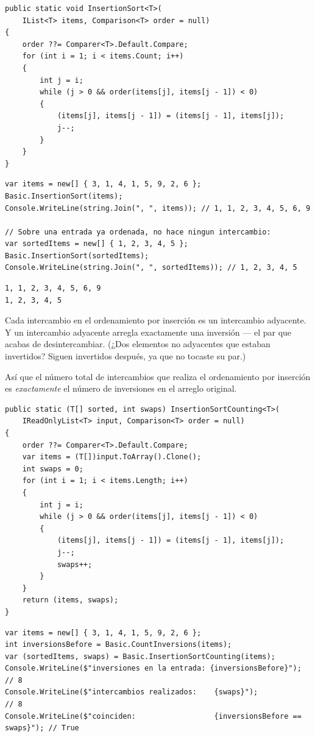 \documentclass[11pt,a4paper]{article}
\begin{document}
\begin{lstlisting}[caption={Ordenamiento por inserción}]
public static void InsertionSort<T>(
    IList<T> items, Comparison<T> order = null)
{
    order ??= Comparer<T>.Default.Compare;
    for (int i = 1; i < items.Count; i++)
    {
        int j = i;
        while (j > 0 && order(items[j], items[j - 1]) < 0)
        {
            (items[j], items[j - 1]) = (items[j - 1], items[j]);
            j--;
        }
    }
}
\end{lstlisting}

\begin{lstlisting}
var items = new[] { 3, 1, 4, 1, 5, 9, 2, 6 };
Basic.InsertionSort(items);
Console.WriteLine(string.Join(", ", items)); // 1, 1, 2, 3, 4, 5, 6, 9

// Sobre una entrada ya ordenada, no hace ningun intercambio:
var sortedItems = new[] { 1, 2, 3, 4, 5 };
Basic.InsertionSort(sortedItems);
Console.WriteLine(string.Join(", ", sortedItems)); // 1, 2, 3, 4, 5
\end{lstlisting}

\begin{verbatim}
1, 1, 2, 3, 4, 5, 6, 9
1, 2, 3, 4, 5
\end{verbatim}

Cada intercambio en el ordenamiento por inserción es un intercambio adyacente. Y un intercambio adyacente arregla exactamente una inversión --- el par que acabas de desintercambiar. (¿Dos elementos no adyacentes que estaban invertidos? Siguen invertidos después, ya que no tocaste su par.)

Así que el número total de intercambios que realiza el ordenamiento por inserción es \emph{exactamente} el número de inversiones en el arreglo original.

\begin{lstlisting}[caption={Ordenamiento por inserción contando intercambios}]
public static (T[] sorted, int swaps) InsertionSortCounting<T>(
    IReadOnlyList<T> input, Comparison<T> order = null)
{
    order ??= Comparer<T>.Default.Compare;
    var items = (T[])input.ToArray().Clone();
    int swaps = 0;
    for (int i = 1; i < items.Length; i++)
    {
        int j = i;
        while (j > 0 && order(items[j], items[j - 1]) < 0)
        {
            (items[j], items[j - 1]) = (items[j - 1], items[j]);
            j--;
            swaps++;
        }
    }
    return (items, swaps);
}
\end{lstlisting}

\begin{lstlisting}
var items = new[] { 3, 1, 4, 1, 5, 9, 2, 6 };
int inversionsBefore = Basic.CountInversions(items);
var (sortedItems, swaps) = Basic.InsertionSortCounting(items);
Console.WriteLine($"inversiones en la entrada: {inversionsBefore}"); // 8
Console.WriteLine($"intercambios realizados:    {swaps}");            // 8
Console.WriteLine($"coinciden:                  {inversionsBefore == swaps}"); // True
\end{lstlisting}
\end{document}
